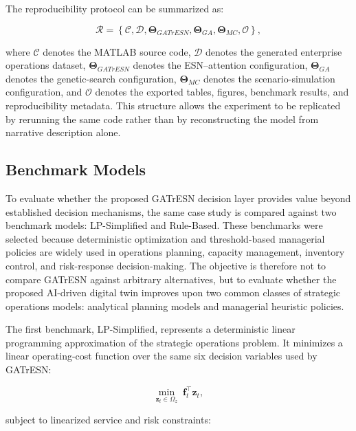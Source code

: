 \documentclass[apajournal,article,submit,pdftex,moreauthors]{Definitions/mdpi}
\begin{document}
The reproducibility protocol can be summarized as:

\begin{linenomath}
\begin{equation}
\mathcal{R}
=
\left\{
\mathcal{C},
\mathcal{D},
\boldsymbol{\Theta}_{GATrESN},
\boldsymbol{\Theta}_{GA},
\boldsymbol{\Theta}_{MC},
\mathcal{O}
\right\},
\label{eq:reproducibility_protocol}
\end{equation}
\end{linenomath}
where $\mathcal{C}$ denotes the MATLAB source code, $\mathcal{D}$ denotes the generated enterprise operations dataset, $\boldsymbol{\Theta}_{GATrESN}$ denotes the ESN--attention configuration, $\boldsymbol{\Theta}_{GA}$ denotes the genetic-search configuration, $\boldsymbol{\Theta}_{MC}$ denotes the scenario-simulation configuration, and $\mathcal{O}$ denotes the exported tables, figures, benchmark results, and reproducibility metadata. This structure allows the experiment to be replicated by rerunning the same code rather than by reconstructing the model from narrative description alone.

\subsection{Benchmark Models}
To evaluate whether the proposed GATrESN decision layer provides value beyond established decision mechanisms, the same case study is compared against two benchmark models: LP-Simplified and Rule-Based. These benchmarks were selected because deterministic optimization and threshold-based managerial policies are widely used in operations planning, capacity management, inventory control, and risk-response decision-making. The objective is therefore not to compare GATrESN against arbitrary alternatives, but to evaluate whether the proposed AI-driven digital twin improves upon two common classes of strategic operations models: analytical planning models and managerial heuristic policies.

The first benchmark, LP-Simplified, represents a deterministic linear programming approximation of the strategic operations problem. It minimizes a linear operating-cost function over the same six decision variables used by GATrESN:

\begin{linenomath}
\begin{equation}
\min_{\mathbf{z}_t\in\Omega_z}
\;
\mathbf{f}_t^{\top}\mathbf{z}_t,
\label{eq:lp_benchmark_objective}
\end{equation}
\end{linenomath}
subject to linearized service and risk constraints:
\end{document}
